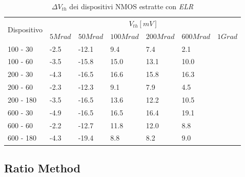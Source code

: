 \documentclass[12pt, letterpaper]{book}
\begin{document}
\begin{table}[H]
  \renewcommand{\arraystretch}{1.3}
  \begin{tabular}{m{2cm}  m{1.1cm} m{1.3cm} m{1.5cm} m{1.5cm} m{1.5cm} m{1cm}}
    \toprule
    \multirow{2}{*}{Dispositivo} & \multicolumn{6}{c}{$V_{th} [mV] $}                                                          \\
    \cmidrule{2-7}
                                 & $5Mrad$                            & $50Mrad$ & $100Mrad$ & $200Mrad$ & $600Mrad$ & $1Grad$ \\
    \midrule
    100 - 30                     & -2.5                               & -12.1    & 9.4       & 7.4       & 2.1       &         \\
    \hline
    100 - 60                     & -3.5                               & -15.8    & 15.0      & 13.1      & 10.0      &         \\
    \hline
    200 - 30                     & -4.3                               & -16.5    & 16.6      & 15.8      & 16.3      &         \\
    \hline
    200 - 60                     & -2.3                               & -12.3    & 9.1       & 7.9       & 4.5       &         \\
    \hline
    200 - 180                    & -3.5                               & -16.5    & 13.6      & 12.2      & 10.5      &         \\
    \hline
    600 - 30                     & -4.9                               & -16.5    & 16.5      & 16.4      & 19.1      &         \\
    \hline
    600 - 60                     & -2.2                               & -12.7    & 11.8      & 12.0      & 8.8       &         \\
    \hline
    600 - 180                    & -4.3                               & -19.4    & 8.8       & 8.2       & 9.0       &         \\
    \bottomrule
  \end{tabular}
  \caption{$\Delta V_{th}$ dei dispositivi NMOS estratte con \emph{ELR}}
  \label{tab:deltaVthELRN}
\end{table}






\subsection{Ratio Method}
\end{document}
